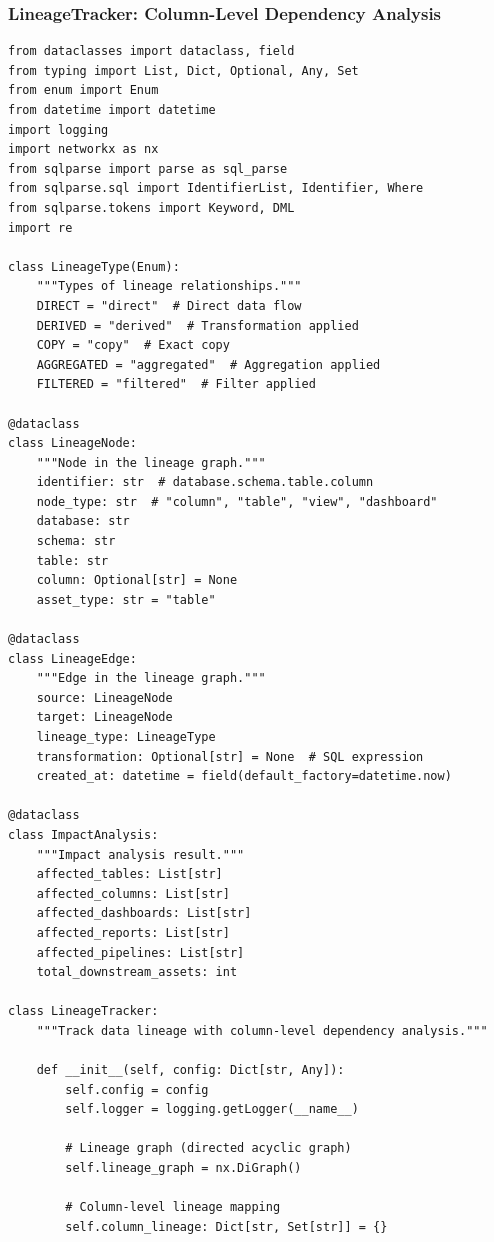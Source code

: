 \subsubsection{LineageTracker: Column-Level Dependency Analysis}

\begin{lstlisting}[style=python, caption=LineageTracker with Column-Level Dependencies]
from dataclasses import dataclass, field
from typing import List, Dict, Optional, Any, Set
from enum import Enum
from datetime import datetime
import logging
import networkx as nx
from sqlparse import parse as sql_parse
from sqlparse.sql import IdentifierList, Identifier, Where
from sqlparse.tokens import Keyword, DML
import re

class LineageType(Enum):
    """Types of lineage relationships."""
    DIRECT = "direct"  # Direct data flow
    DERIVED = "derived"  # Transformation applied
    COPY = "copy"  # Exact copy
    AGGREGATED = "aggregated"  # Aggregation applied
    FILTERED = "filtered"  # Filter applied

@dataclass
class LineageNode:
    """Node in the lineage graph."""
    identifier: str  # database.schema.table.column
    node_type: str  # "column", "table", "view", "dashboard"
    database: str
    schema: str
    table: str
    column: Optional[str] = None
    asset_type: str = "table"

@dataclass
class LineageEdge:
    """Edge in the lineage graph."""
    source: LineageNode
    target: LineageNode
    lineage_type: LineageType
    transformation: Optional[str] = None  # SQL expression
    created_at: datetime = field(default_factory=datetime.now)

@dataclass
class ImpactAnalysis:
    """Impact analysis result."""
    affected_tables: List[str]
    affected_columns: List[str]
    affected_dashboards: List[str]
    affected_reports: List[str]
    affected_pipelines: List[str]
    total_downstream_assets: int

class LineageTracker:
    """Track data lineage with column-level dependency analysis."""

    def __init__(self, config: Dict[str, Any]):
        self.config = config
        self.logger = logging.getLogger(__name__)

        # Lineage graph (directed acyclic graph)
        self.lineage_graph = nx.DiGraph()

        # Column-level lineage mapping
        self.column_lineage: Dict[str, Set[str]] = {}


\end{lstlisting}
